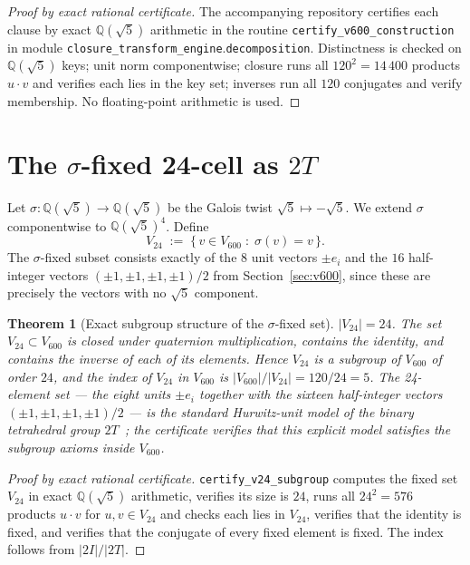 \documentclass[11pt]{article}
\newcommand{\Vsix}{V_{600}}
\newcommand{\Vtwentyfour}{V_{24}}
\newcommand{\twoI}{2I}
\newcommand{\twoT}{2T}
\theoremstyle{plain}
\newtheorem{theorem}{Theorem}
\theoremstyle{definition}
\begin{document}
\begin{proof}[Proof by exact rational certificate]
The accompanying repository certifies each clause by exact
$\mathbb{Q}(\sqrt 5)$ arithmetic in the routine
\texttt{certify\_v600\_construction}\allowbreak{} in module
\texttt{closure\_transform\_engine}\allowbreak.\texttt{decomposition}.
Distinctness is checked on $\mathbb{Q}(\sqrt 5)$ keys; unit norm
componentwise; closure runs all $120^2 = 14\,400$ products
$u\cdot v$ and verifies each lies in the key set; inverses run all
$120$ conjugates and verify membership.  No floating-point
arithmetic is used.
\end{proof}

\section{The $\sigma$-fixed 24-cell as $\twoT$}\label{sec:v24}

Let $\sigma\colon \mathbb{Q}(\sqrt 5) \to \mathbb{Q}(\sqrt 5)$ be the
Galois twist $\sqrt 5 \mapsto -\sqrt 5$.  We extend $\sigma$
componentwise to $\mathbb{Q}(\sqrt 5)^4$.  Define
\[
  \Vtwentyfour \;:=\; \{\,v \in \Vsix \;:\; \sigma(v) = v\,\}.
\]
The $\sigma$-fixed subset consists exactly of the $8$ unit vectors
$\pm e_i$ and the $16$ half-integer vectors
$(\pm 1, \pm 1, \pm 1, \pm 1)/2$ from Section~\ref{sec:v600}, since
these are precisely the vectors with no $\sqrt 5$ component.

\begin{theorem}[Exact subgroup structure of the $\sigma$-fixed set]\label{thm:v24}
$|\Vtwentyfour| = 24$.  The set $\Vtwentyfour\subset\Vsix$ is closed
under quaternion multiplication, contains the identity, and contains
the inverse of each of its elements.  Hence $\Vtwentyfour$ is a
subgroup of $\Vsix$ of order $24$, and the index of
$\Vtwentyfour$ in $\Vsix$ is $|\Vsix|/|\Vtwentyfour| = 120/24 = 5$.
The 24-element set --- the eight units $\pm e_i$ together with the
sixteen half-integer vectors $(\pm 1, \pm 1, \pm 1, \pm 1)/2$ --- is
the standard Hurwitz-unit model of the binary tetrahedral group
$\twoT$~\cite{Coxeter1973,ConwaySloane1999}; the certificate
verifies that this explicit model satisfies the subgroup axioms
inside $\Vsix$.
\end{theorem}

\begin{proof}[Proof by exact rational certificate]
\texttt{certify\_v24\_subgroup} computes the fixed set
$\Vtwentyfour$ in exact $\mathbb{Q}(\sqrt 5)$ arithmetic, verifies
its size is $24$, runs all $24^2 = 576$ products $u\cdot v$ for
$u, v\in\Vtwentyfour$ and checks each lies in $\Vtwentyfour$,
verifies that the identity is fixed, and verifies that the conjugate
of every fixed element is fixed.  The index follows from
$|\twoI|/|\twoT|$.
\end{proof}
\end{document}
